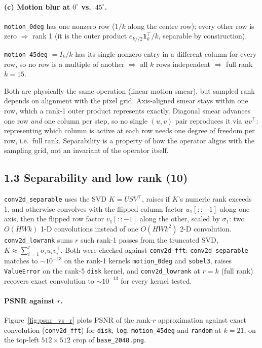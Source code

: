 \documentclass[11pt]{article}
\begin{document}
\paragraph{(c) Motion blur at $0^\circ$ vs.\ $45^\circ$.}
\texttt{motion\_0deg} has one nonzero row ($1/k$ along the centre row); every other row is zero
$\Rightarrow$ rank 1 (it is the outer product $e_{k//2}\mathbf{1}_k^\top/k$, separable by
construction).

\texttt{motion\_45deg} $= I_k/k$ has its single nonzero entry in a different column for every
row, so no row is a multiple of another $\Rightarrow$ all $k$ rows independent $\Rightarrow$ full
rank $k=15$.

Both are physically the same operation (linear motion smear), but sampled rank depends on
alignment with the pixel grid. Axis-aligned smear stays within one row, which a rank-1 outer
product represents exactly. Diagonal smear advances one row \emph{and} one column per step, so no
single $(u,v)$ pair reproduces it via $uv^\top$: representing which column is active at each row
needs one degree of freedom per row, i.e.\ full rank. Separability is a property of how the
operator aligns with the sampling grid, not an invariant of the operator itself.

\subsection*{1.3 Separability and low rank (10)}

\texttt{conv2d\_separable} uses the SVD $K = U S V^\top$, raises if $K$'s numeric rank exceeds 1,
and otherwise convolves with the flipped column factor $u_1[::-1]$ along one axis, then the
flipped row factor $v_1[::-1]$ along the other, scaled by $\sigma_1$: two $O(HWk)$ 1-D
convolutions instead of one $O(HWk^2)$ 2-D convolution. \texttt{conv2d\_lowrank} sums $r$ such
rank-1 passes from the truncated SVD, $K \approx \sum_{i=1}^r \sigma_i u_i v_i^\top$. Both were
checked against \texttt{conv2d\_fft}: \texttt{conv2d\_separable} matches to $\sim10^{-13}$ on the
rank-1 kernels \texttt{motion\_0deg} and \texttt{sobel3}, raises \texttt{ValueError} on the
rank-5 \texttt{disk} kernel, and \texttt{conv2d\_lowrank} at $r=k$ (full rank) recovers exact
convolution to $\sim10^{-13}$ for every kernel tested.

\paragraph{PSNR against $r$.}
Figure~\ref{fig:psnr_vs_r} plots PSNR of the rank-$r$ approximation against exact convolution
(\texttt{conv2d\_fft}) for \texttt{disk}, \texttt{log}, \texttt{motion\_45deg} and
\texttt{random} at $k=21$, on the top-left $512\times512$ crop of \texttt{base\_2048.png}.
\end{document}
